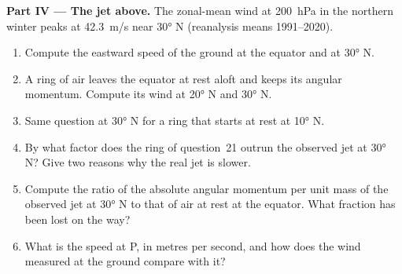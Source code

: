 \begin{problem}
\medskip
\noindent\textbf{Part IV --- The jet above.} The zonal-mean wind at \qty{200}{hPa} in
the northern winter peaks at \qty{42.3}{m/s} near \ang{30} N (reanalysis means
1991--2020).
\begin{enumerate}[resume]
  \item Compute the eastward speed of the ground at the equator and at \ang{30} N.
  \item A ring of air leaves the equator at rest aloft and keeps its angular
        momentum. Compute its wind at \ang{20} N and \ang{30} N.
  \item Same question at \ang{30} N for a ring that starts at rest at \ang{10} N.
  \item By what factor does the ring of question~21 outrun the observed jet at
        \ang{30} N? Give two reasons why the real jet is slower.
  \item Compute the ratio of the absolute angular momentum per unit mass of the
        observed jet at \ang{30} N to that of air at rest at the equator. What
        fraction has been lost on the way?
  \item What is the  speed at P, in metres per second, and how does
        the wind measured at the ground compare with it?
\end{enumerate}
\end{problem}
